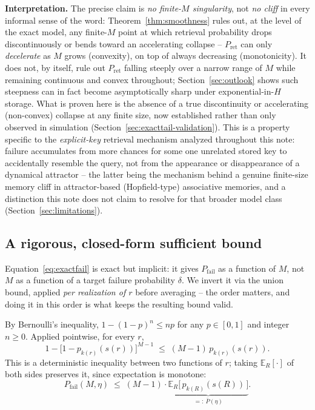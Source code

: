\documentclass[11pt]{article}
\begin{document}
\noindent\textbf{Interpretation.} The precise claim is \emph{no finite-$M$ singularity}, not
\emph{no cliff} in every informal sense of the word: Theorem~\ref{thm:smoothness} rules out, at the
level of the exact model, any finite-$M$ point at which retrieval probability drops
discontinuously or bends toward an accelerating collapse -- $P_{\mathrm{ret}}$ can only
\emph{decelerate} as $M$ grows (convexity), on top of always decreasing (monotonicity). It does
not, by itself, rule out $P_{\mathrm{ret}}$ falling steeply over a narrow range of $M$ while
remaining continuous and convex throughout; Section~\ref{sec:outlook} shows such steepness can in
fact become asymptotically sharp under exponential-in-$H$ storage. What is proven here is the
absence of a true discontinuity or accelerating (non-convex) collapse at any finite size, now
established rather than only observed in simulation (Section~\ref{sec:exacttail-validation}). This is a property specific
to the \emph{explicit-key} retrieval mechanism analyzed throughout this note: failure accumulates from
more chances for some one unrelated stored key to accidentally resemble the query, not from the
appearance or disappearance of a dynamical attractor -- the latter being the mechanism behind a
genuine finite-size memory cliff in attractor-based (Hopfield-type) associative memories, and a
distinction this note does not claim to resolve for that broader model class (Section~\ref{sec:limitations}).

\subsection{A rigorous, closed-form sufficient bound}

Equation~\ref{eq:exactfail} is exact but implicit: it gives $P_{\text{fail}}$ as a function of
$M$, not $M$ as a function of a target failure probability $\delta$. We invert it via the union
bound, applied \emph{per realization of $r$} before averaging -- the order matters, and doing it
in this order is what keeps the resulting bound valid.

By Bernoulli's inequality, $1-(1-p)^n \le np$ for any $p\in[0,1]$ and integer $n \ge 0$. Applied
pointwise, for every $r$,
\[
1 - \big[1-p_{k(r)}(s(r))\big]^{M-1} \;\le\; (M-1)\,p_{k(r)}(s(r)).
\]
This is a deterministic inequality between two functions of $r$; taking $\mathbb{E}_R[\cdot]$ of
both sides preserves it, since expectation is monotone:
\begin{equation}
P_{\text{fail}}(M,\eta) \;\le\; (M-1) \cdot
\underbrace{\mathbb{E}_R\big[\,p_{k(R)}(s(R))\,\big]}_{=:\ \bar P(\eta)}.
\label{eq:pbar}
\end{equation}
\end{document}
